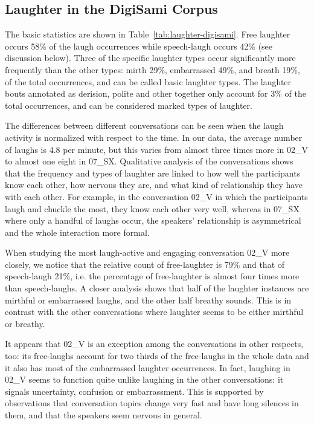 \documentclass[10pt,journal,compsoc]{IEEEtran}
\begin{document}
\subsection{Laughter in the DigiSami Corpus}

The basic statistics are shown in Table~\ref{tab:laughter-digisami}. Free laughter occurs 58\% of the laugh occurrences while speech-laugh occurs 42\% (see discussion below). Three of the specific laughter types occur significantly more frequently than the other types: mirth 29\%, embarrassed 49\%, and breath 19\%, of the total occurrences, and can be called basic laughter types. The laughter bouts annotated as derision, polite and other together only account for 3\% of the total occurrences, and can be considered marked types of laughter.

The differences between different conversations can be seen when the laugh activity is normalized with respect to the time. In our data, the average number of laughs is 4.8 per minute, but this varies from almost three times more in 02\_V to almost one eight in 07\_SX. Qualitative analysis of the conversations shows that the frequency and types of laughter are linked to how well the participants know each other, how nervous they are, and what kind of relationship they have with each other. For example, in the conversation 02\_V in which the participants laugh and chuckle the most, they know each other very well, whereas in 07\_SX where only a handful of laughs occur, the speakers' relationship is asymmetrical and the whole interaction more formal.

When studying the most laugh-active and engaging conversation 02\_V more closely, we notice that the relative count of free-laughter is 79\% and that of speech-laugh 21\%, i.e. the percentage of free-laughter is almost four times more than speech-laughs. A closer analysis shows that half of the laughter instances are mirthful or embarrassed laughs, and the other half breathy sounds. This is in contrast with the other conversations where laughter seems to be either mirthful or breathy.

It appears that 02\_V is an exception among the conversations in other respects, too: its free-laughs account for two thirds of the free-laughs in the whole data and it also has most of the embarrassed laughter occurrences. In fact, laughing in 02\_V seems to function quite unlike laughing in the other conversations: it signals uncertainty, confusion or embarrassment. This is supported by observations that conversation topics change very fast and have long silences in them, and that the speakers seem nervous in general.
\end{document}

